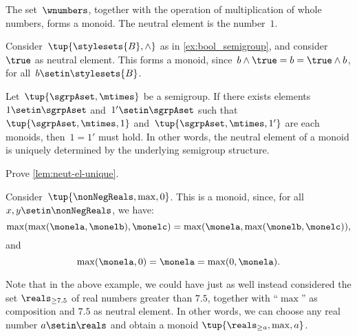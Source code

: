 \begin{example}
    The set~$\wnumbers$, together with the operation of multiplication of whole numbers, forms a monoid.
    The neutral element is the number~$1$.
\end{example}

\begin{example}
    \label{ex:bool_monoid}
    Consider~$\tup{\stylesets{B},\wedge}$ as in \cref{ex:bool_semigroup}, and consider~$\true$ as neutral element.
    This forms a monoid, since~$b\wedge \true=b=\true \wedge b$, for all~$b\setin \stylesets{B}$.
\end{example}


\begin{lemma}
    \label{lem:neut-el-unique}
    Let~$\tup{\sgrpAset, \mtimes}$ be a semigroup.
    If there exists elements~$1 \setin \sgrpAset$ and~$1' \setin \sgrpAset$ such that~$\tup{\sgrpAset, \mtimes, 1}$ and~$\tup{\sgrpAset, \mtimes, 1'}$ are each monoids, then~$1 = 1'$ must hold.
    In other words, the neutral element of a monoid is uniquely determined by the underlying semigroup structure.
\end{lemma}

\begin{gradedexercise}
    \label{ex:UniqueNeutralMonoid}
    Prove \cref{lem:neut-el-unique}.
\end{gradedexercise}


\begin{example}
    Consider~$\tup{\nonNegReals,\max,0}$.
    This is a monoid, since, for all~$x,y\setin \nonNegReals$, we have:
    \begin{equation*}
        \max(\max(\monela,\monelb),\monelc)=\max(\monela,\max(\monelb,\monelc)),
    \end{equation*}
    and
    \begin{equation*}
        \max(\monela,0)=\monela=\max(0,\monela).
    \end{equation*}
\end{example}

\begin{remark}
    Note that in the above example, we could have just as well instead considered the set $\reals_{\geq 7.5}$ of real numbers greater than $7.5$, together with ``$\max$'' as composition and $7.5$ as neutral element.
    In other words, we can choose any real number $a \setin \reals$ and obtain a monoid $\tup{\reals_{\geq a},\max, a}$.
\end{remark}

